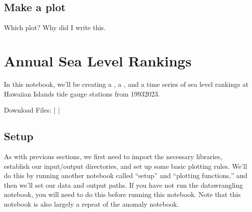 \documentclass[letterpaper,10pt,english]{jupyterBook}
\begin{document}
\chapter{Make a plot}
\label{\detokenize{notebooks/regional_and_local/SL_anomaly_annual:make-a-plot}}
\sphinxAtStartPar
Which plot? Why did I write this.

\sphinxstepscope


\part{Annual Sea Level Rankings}
\label{\detokenize{notebooks/regional_and_local/SL_Rankings_annual:annual-sea-level-rankings}}\label{\detokenize{notebooks/regional_and_local/SL_Rankings_annual::doc}}
\begin{figure}[htbp]
\centering

\noindent{}
\end{figure}

\sphinxAtStartPar
In this notebook, we’ll be creating a {\hyperref[\detokenize{notebooks/regional_and_local/SL_Rankings_annual:sl-rankings-results}]{}}, a {\hyperref[\detokenize{notebooks/regional_and_local/SL_Rankings_annual:SL_rankings_map}]{}}, and a time series {\hyperref[\detokenize{notebooks/regional_and_local/SL_Rankings_annual:sl-rankings-timeseries}]{}} of sea level rankings at Hawaiian Islands tide gauge stations from 1993\sphinxhyphen{}2023.

\sphinxAtStartPar
Download Files:
 |
 |


\chapter{Setup}
\label{\detokenize{notebooks/regional_and_local/SL_Rankings_annual:setup}}
\sphinxAtStartPar
As with previous sections, we first need to import the necessary libraries, establish our input/output directories, and set up some basic plotting rules. We’ll do this by running another notebook called “setup” and “plotting functions,” and then we’ll set our data and output paths. If you have not run the datawrangling notebook, you will need to do this before running this notebook. Note that this notebook is also largely a repeat of the anomaly notebook.
\end{document}
